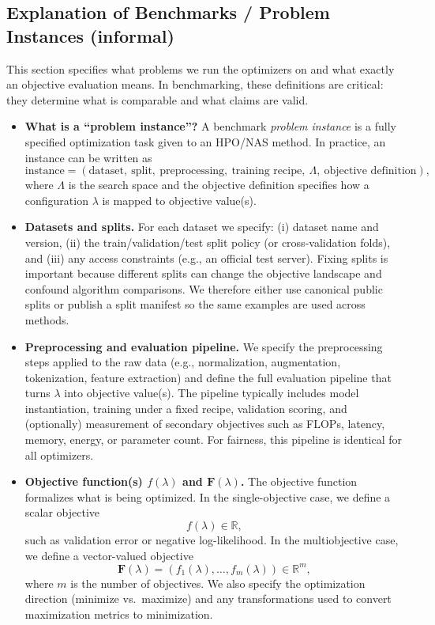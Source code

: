 \subsection*{Explanation of Benchmarks / Problem Instances (informal)}
This section specifies what problems we run the optimizers on and what exactly an objective evaluation means.
In benchmarking, these definitions are critical: they determine what is comparable and what claims are valid.

\begin{itemize}
    \item \textbf{What is a ``problem instance''?}
    A benchmark \emph{problem instance} is a fully specified optimization task given to an HPO/NAS method.
    In practice, an instance can be written as
    \[
        \text{instance} =
        (\text{dataset},\ \text{split},\ \text{preprocessing},\ \text{training recipe},\ \Lambda,\ \text{objective definition}),
    \]
    where \(\Lambda\) is the search space and the objective definition specifies how a configuration \(\lambda\) is mapped to objective value(s).

    \item \textbf{Datasets and splits.}
    For each dataset we specify:
    (i) dataset name and version,
    (ii) the train/validation/test split policy (or cross-validation folds),
    and (iii) any access constraints (e.g., an official test server).
    Fixing splits is important because different splits can change the objective landscape and confound algorithm comparisons.
    We therefore either use canonical public splits or publish a split manifest so the same examples are used across methods.

    \item \textbf{Preprocessing and evaluation pipeline.}
    We specify the preprocessing steps applied to the raw data (e.g., normalization, augmentation, tokenization, feature extraction)
    and define the full evaluation pipeline that turns \(\lambda\) into objective value(s).
    The pipeline typically includes model instantiation, training under a fixed recipe, validation scoring,
    and (optionally) measurement of secondary objectives such as FLOPs, latency, memory, energy, or parameter count.
    For fairness, this pipeline is identical for all optimizers.

    \item \textbf{Objective function(s) \(f(\lambda)\) and \(\mathbf{F}(\lambda)\).}
    The objective function formalizes what is being optimized.
    In the single-objective case, we define a scalar objective
    \[
        f(\lambda) \in \mathbb{R},
    \]
    such as validation error or negative log-likelihood.
    In the multiobjective case, we define a vector-valued objective
    \[
        \mathbf{F}(\lambda) = (f_1(\lambda),\ldots,f_m(\lambda)) \in \mathbb{R}^m,
    \]
    where \(m\) is the number of objectives.
    We also specify the optimization direction (minimize vs.\ maximize) and any transformations used to convert maximization metrics to minimization.


\end{itemize}
